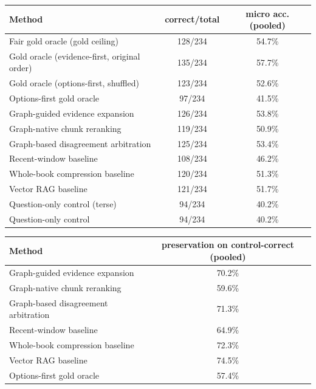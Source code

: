 \begin{tabular}{lcc}
\toprule
Method & correct/total & micro acc. (pooled) \\
\midrule
Fair gold oracle (gold ceiling) & 128/234 & 54.7\% \\
Gold oracle (evidence-first, original order) & 135/234 & 57.7\% \\
Gold oracle (options-first, shuffled) & 123/234 & 52.6\% \\
Options-first gold oracle & 97/234 & 41.5\% \\
Graph-guided evidence expansion & 126/234 & 53.8\% \\
Graph-native chunk reranking & 119/234 & 50.9\% \\
Graph-based disagreement arbitration & 125/234 & 53.4\% \\
Recent-window baseline & 108/234 & 46.2\% \\
Whole-book compression baseline & 120/234 & 51.3\% \\
Vector RAG baseline & 121/234 & 51.7\% \\
Question-only control (terse) & 94/234 & 40.2\% \\
Question-only control & 94/234 & 40.2\% \\
\bottomrule
\end{tabular}

\begin{tabular}{lc}
\toprule
Method & preservation on control-correct (pooled) \\
\midrule
Graph-guided evidence expansion & 70.2\% \\
Graph-native chunk reranking & 59.6\% \\
Graph-based disagreement arbitration & 71.3\% \\
Recent-window baseline & 64.9\% \\
Whole-book compression baseline & 72.3\% \\
Vector RAG baseline & 74.5\% \\
Options-first gold oracle & 57.4\% \\
\bottomrule
\end{tabular}
